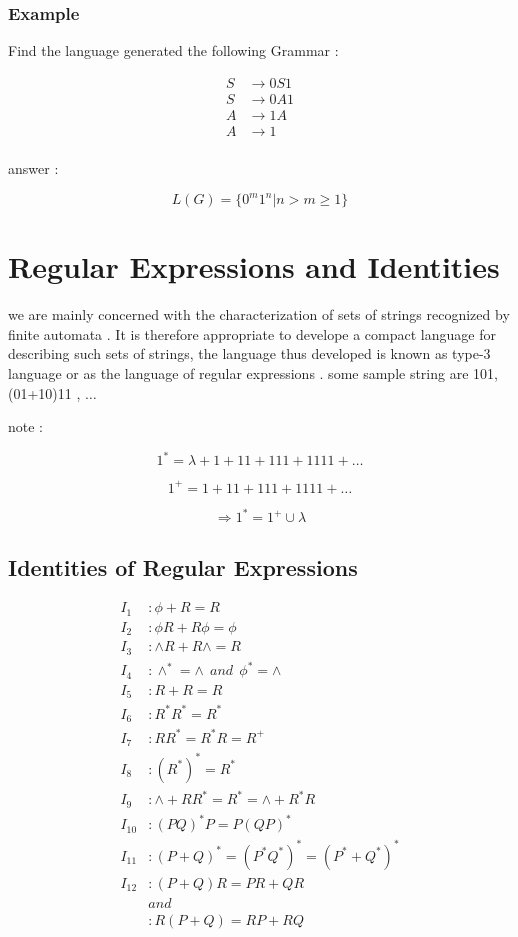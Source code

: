 \documentclass[12pt]{book}
\begin{document}
\subsection{Example}

Find the language generated the following Grammar :

\begin{align*}
S &\to 0S1 \\
S &\to 0A1 \\
A &\to 1A \\
A &\to 1 \\
\end{align*}


answer :

$$
L(G) = \{ 0^{m}1^{n} | n > m \geq 1 \}
$$


\chapter{Regular Expressions and Identities}

we are mainly concerned with the characterization of sets of strings recognized by finite automata .
It is therefore appropriate to develope a compact language for describing such sets of strings, the language thus developed is known as type-3 language or as the language of regular expressions .
some sample string are 101, (01+10)11 , $\dots$

note : 

$$
1^{*} = \lambda + 1 + 11 + 111 + 1111 + \dots
$$

$$
1^{+} = 1 + 11 + 111 + 1111 + \dots
$$

$$
\Rightarrow 1^{*} = 1^{+} \cup \lambda
$$

\section{Identities of Regular Expressions}

\begin{align*}
I_{1} &: \phi + R = R \\
I_{2} &: \phi R + R \phi = \phi \\
I_{3} &: \wedge R + R \wedge = R \\
I_{4} &: \wedge^{*}  = \wedge \:\: and \:\: \phi^{*} = \wedge \\
I_{5} &: R + R = R \\
I_{6} &: R^{*} R^{*} = R^{*} \\
I_{7} &: R R^{*} = R^{*} R = R^{+} \\
I_{8} &: (R^{*})^{*} = R^{*} \\
I_{9} &: \wedge + R R^{*} = R^{*} = \wedge +  R^{*} R \\
I_{10} &: (PQ)^{*} P = P (QP)^{*} \\
I_{11} &: (P + Q)^{*} = (P^{*} Q^{*})^{*} = (P^{*} + Q^{*})^{*} \\
I_{12} &: (P + Q) R = P R + Q R \\
&and \\
&: R (P + Q) = R P + R Q
\end{align*}
\end{document}
